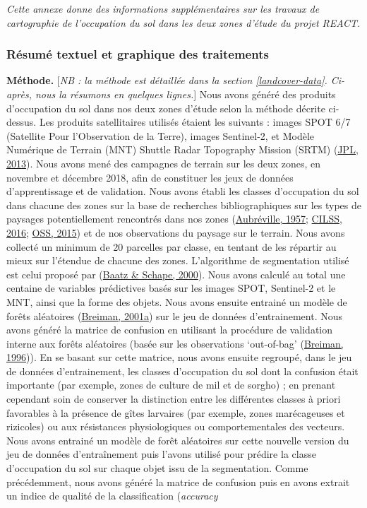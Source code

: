 \documentclass[12pt,twoside]{reedthesis}
\begin{document}
\emph{Cette annexe donne des informations supplémentaires sur les travaux de cartographie de l'occupation du sol dans les deux zones d'étude du projet REACT.}

\hypertarget{details-annex-landcover}{%
\subsubsection{Résumé textuel et graphique des traitements}\label{details-annex-landcover}}

\textbf{Méthode.} {[}\emph{NB : la méthode est détaillée dans la section \ref{landcover-data}. Ci-après, nous la résumons en quelques lignes.}{]} Nous avons généré des produits d'occupation du sol dans nos deux zones d'étude selon la méthode décrite ci-dessus. Les produits satellitaires utilisés étaient les suivants : images SPOT 6/7 (Satellite Pour l'Observation de la Terre), images Sentinel-2, et Modèle Numérique de Terrain (MNT) Shuttle Radar Topography Mission (SRTM) (\protect\hyperlink{ref-nasa_jpl_nasa_2013}{JPL, 2013}). Nous avons mené des campagnes de terrain sur les deux zones, en novembre et décembre 2018, afin de constituer les jeux de données d'apprentissage et de validation. Nous avons établi les classes d'occupation du sol dans chacune des zones sur la base de recherches bibliographiques sur les types de paysages potentiellement rencontrés dans nos zones (\protect\hyperlink{ref-aubreville_accord_1957}{Aubréville, 1957}; \protect\hyperlink{ref-cilss_2016_landscapes_nodate}{CILSS, 2016}; \protect\hyperlink{ref-oss_landcover_bf}{OSS, 2015}) et de nos observations du paysage sur le terrain. Nous avons collecté un minimum de 20 parcelles par classe, en tentant de les répartir au mieux sur l'étendue de chacune des zones. L'algorithme de segmentation utilisé est celui proposé par (\protect\hyperlink{ref-baatz_schape_2000}{Baatz \& Schape, 2000}). Nous avons calculé au total une centaine de variables prédictives basés sur les images SPOT, Sentinel-2 et le MNT, ainsi que la forme des objets. Nous avons ensuite entrainé un modèle de forêts aléatoires (\protect\hyperlink{ref-breiman_random_2001}{Breiman, 2001a}) sur le jeu de données d'entrainement. Nous avons généré la matrice de confusion en utilisant la procédure de validation interne aux forêts aléatoires (basée sur les observations `out-of-bag' (\protect\hyperlink{ref-Breiman1996OUTOFBAGE}{Breiman, 1996})). En se basant sur cette matrice, nous avons ensuite regroupé, dans le jeu de données d'entrainement, les classes d'occupation du sol dont la confusion était importante (par exemple, zones de culture de mil et de sorgho) ; en prenant cependant soin de conserver la distinction entre les différentes classes à priori favorables à la présence de gîtes larvaires (par exemple, zones marécageuses et rizicoles) ou aux résistances physiologiques ou comportementales des vecteurs. Nous avons entrainé un modèle de forêt aléatoires sur cette nouvelle version du jeu de données d'entraînement puis l'avons utilisé pour prédire la classe d'occupation du sol sur chaque objet issu de la segmentation. Comme précédemment, nous avons généré la matrice de confusion puis en avons extrait un indice de qualité de la classification (\emph{accuracy} 
\end{document}
